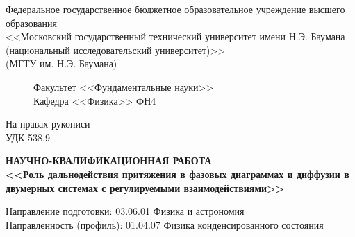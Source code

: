 \documentclass[%
candidate, %
subf, %
times %
]{disser}
\begin{document}
%


\begin{titlepage}

\begin{center}
{
\footnotesize{}
Федеральное государственное бюджетное образовательное учреждение высшего образования\\
<<Московский государственный технический университет имени Н.Э. Баумана\\ (национальный исследовательский университет)>>\\(МГТУ им. Н.Э. Баумана)\\
}
\end{center}
\begin{figure}[h!]
\begin{minipage}[b]{0.9\textwidth}\centering
Факультет <<Фундаментальные науки>>\\
Кафедра <<Физика>> ФН4
\\\vspace{1.5cm}
\end{minipage}
\end{figure}
\begin{flushright}
На правах рукописи\\
УДК 538.9
\end{flushright}

\vspace{10mm}

\begin{center}
\textbf{НАУЧНО-КВАЛИФИКАЦИОННАЯ РАБОТА}\\\vspace{5mm}
\textbf{<<Роль дальнодействия притяжения в фазовых диаграммах и диффузии в двумерных системах с регулируемыми взаимодействиями>>}
\end{center}


\vspace{5mm}

\begin{flushleft}
Направление подготовки: 03.06.01 Физика и астрономия\\
Направленность (профиль): 01.04.07 Физика конденсированного состояния
\end{flushleft}


\end{titlepage}
\end{document}
